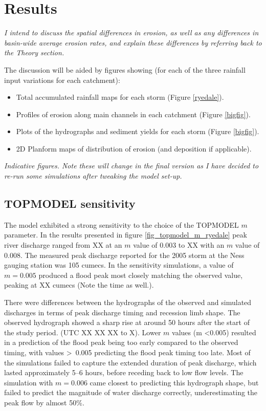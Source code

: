 \section{Results}
\textit{I intend to discuss the spatial differences in erosion, as well as any differences in basin-wide average erosion rates, and explain these differences by referring back to the Theory section.}

The discussion will be aided by figures showing (for each of the three rainfall input variations for each catchment):

\begin{itemize}
\item Total accumulated rainfall maps for each storm (Figure \ref{ryedale}). 
\item Profiles of erosion along main channels in each catchment (Figure \ref{bigfig}).
\item Plots of the hydrographs and sediment yields for each storm (Figure \ref{bigfig}).
\item 2D Planform maps of distribution of erosion (and deposition if applicable).
\end{itemize}

\textit{Indicative figures. Note these will change in the final version as I have decided to re-run some simulations after tweaking the model set-up.}

\subsection{TOPMODEL sensitivity}

The model exhibited a strong sensitivity to the choice of the TOPMODEL \( m\) parameter. In the results presented in figure \ref{fig_topmodel_m_ryedale} peak river discharge ranged from XX at an \(m\) value of 0.003 to XX with an \(m\) value of 0.008. The measured peak discharge reported for the 2005 storm at the Ness gauging station was 105 cumecs. In the sensitivity simulations, a value of \(m = 0.005\) produced a flood peak most closely matching the observed value, peaking at XX cumecs (Note the time as well.). 

There were differences between the hydrographs of the observed and simulated discharges in terms of peak discharge timing and recession limb shape. The observed hydrograph showed a sharp rise at around 50 hours after the start of the study period. (UTC XX XX XX to X). Lower \(m\) values (m \textless 0.005) resulted in a prediction of the flood peak being too early compared to the observed timing, with values \textgreater \ 0.005 predicting the flood peak timing too late. Most of the simulations failed to capture the extended duration of peak discharge, which lasted approximately 5--6 hours, before receding back to low flow levels. The simulation with \(m = 0.006\) came closest to predicting this hydrograph shape, but failed to predict the magnitude of water discharge correctly, underestimating the peak flow by almost 50\%. 

